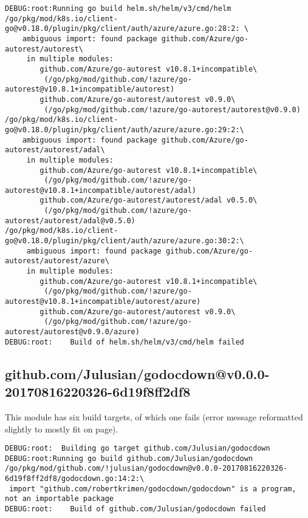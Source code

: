 \documentclass[a4paper]{paper}
\begin{document}
\begin{verbatim}
DEBUG:root:Running go build helm.sh/helm/v3/cmd/helm
/go/pkg/mod/k8s.io/client-go@v0.18.0/plugin/pkg/client/auth/azure/azure.go:28:2: \
    ambiguous import: found package github.com/Azure/go-autorest/autorest\
     in multiple modules:
        github.com/Azure/go-autorest v10.8.1+incompatible\
         (/go/pkg/mod/github.com/!azure/go-autorest@v10.8.1+incompatible/autorest)
        github.com/Azure/go-autorest/autorest v0.9.0\
         (/go/pkg/mod/github.com/!azure/go-autorest/autorest@v0.9.0)
/go/pkg/mod/k8s.io/client-go@v0.18.0/plugin/pkg/client/auth/azure/azure.go:29:2:\
    ambiguous import: found package github.com/Azure/go-autorest/autorest/adal\
     in multiple modules:
        github.com/Azure/go-autorest v10.8.1+incompatible\
         (/go/pkg/mod/github.com/!azure/go-autorest@v10.8.1+incompatible/autorest/adal)
        github.com/Azure/go-autorest/autorest/adal v0.5.0\
         (/go/pkg/mod/github.com/!azure/go-autorest/autorest/adal@v0.5.0)
/go/pkg/mod/k8s.io/client-go@v0.18.0/plugin/pkg/client/auth/azure/azure.go:30:2:\
     ambiguous import: found package github.com/Azure/go-autorest/autorest/azure\
     in multiple modules:
        github.com/Azure/go-autorest v10.8.1+incompatible\
         (/go/pkg/mod/github.com/!azure/go-autorest@v10.8.1+incompatible/autorest/azure)
        github.com/Azure/go-autorest/autorest v0.9.0\
         (/go/pkg/mod/github.com/!azure/go-autorest/autorest@v0.9.0/azure)
DEBUG:root:    Build of helm.sh/helm/v3/cmd/helm failed
\end{verbatim}

\subsection{github.com/Julusian/godocdown@v0.0.0-20170816220326-6d19f8ff2df8}

This module has six build targets, of which one fails (error message reformatted slightly to mostly fit on page).

\begin{verbatim}
DEBUG:root:  Building go target github.com/Julusian/godocdown
DEBUG:root:Running go build github.com/Julusian/godocdown
/go/pkg/mod/github.com/!julusian/godocdown@v0.0.0-20170816220326-6d19f8ff2df8/godocdown.go:14:2:\
 import "github.com/robertkrimen/godocdown/godocdown" is a program, not an importable package
DEBUG:root:    Build of github.com/Julusian/godocdown failed
\end{verbatim}
\end{document}
